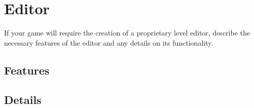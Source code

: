 \section{Editor} %
If your game will require the creation of a proprietary level editor, describe
the necessary features of the editor and any details on its functionality.

\subsection{Features}%

\subsection{Details}%